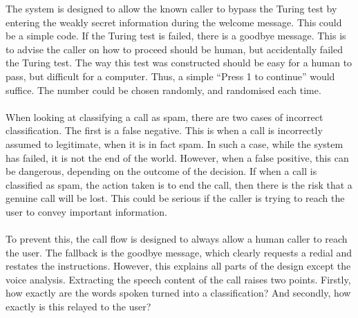 \documentclass[main.tex]{subfiles}
\begin{document}
The system is designed to allow the known caller to bypass the Turing test by entering the weakly secret information during the welcome message. This could be a simple code. If the Turing test is failed, there is a goodbye message. This is to advise the caller on how to proceed should be human, but accidentally failed the Turing test. The way this test was constructed should be easy for a human to pass, but difficult for a computer. Thus, a simple ``Press 1 to continue'' would suffice. The number could be chosen randomly, and randomised each time.
\\\\
When looking at classifying a call as spam, there are two cases of incorrect classification. The first is a false negative. This is when a call is incorrectly assumed to legitimate, when it is in fact spam. In such a case, while the system has failed, it is not the end of the world. However, when a false positive, this can be dangerous, depending on the outcome of the decision. If when a call is classified as spam, the action taken is to end the call, then there is the risk that a genuine call will be lost. This could be serious if the caller is trying to reach the user to convey important information.
\\\\
To prevent this, the call flow is designed to always allow a human caller to reach the user. The fallback is the goodbye message, which clearly requests a redial and restates the instructions. However, this explains all parts of the design except the voice analysis. Extracting the speech content of the call raises two points. Firstly, how exactly are the words spoken turned into a classification? And secondly, how exactly is this relayed to the user?
\end{document}
